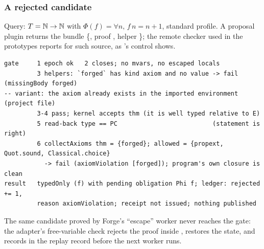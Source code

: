 \subsubsection{A rejected candidate}

Query: $T = \mathbb{N} \to \mathbb{N}$ with $\Phi(f) = \forall n,\, f\,n = n + 1$, standard profile. A proposal plugin returns the bundle \{, proof , helper \}; the remote checker used in the prototypes reports  for such source, as 's control shows.
\begin{lstlisting}
gate     1 epoch ok   2 closes; no mvars, no escaped locals
         3 helpers: `forged` has kind axiom and no value -> fail (missingBody forged)
-- variant: the axiom already exists in the imported environment (project file)
         3-4 pass; kernel accepts thm (it is well typed relative to E)
         5 read-back type == PC                          (statement is right)
         6 collectAxioms thm = {forged}; allowed = {propext, Quot.sound, Classical.choice}
           -> fail (axiomViolation [forged]); program's own closure is clean
result   typedOnly (f) with pending obligation Phi f; ledger: rejected += 1,
         reason axiomViolation; receipt not issued; nothing published
\end{lstlisting}

The same candidate proved by Forge's ``escape'' worker never reaches the gate: the adapter's free-variable check rejects the proof inside , restores the state, and records  in the replay record before the next worker runs\cite{forge}.
